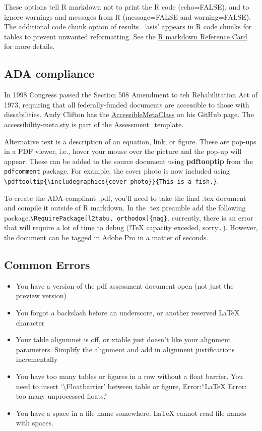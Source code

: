 \documentclass[12pt,]{article}
\begin{document}
These options tell R markdown not to print the R code (echo=FALSE), and
to ignore warnings and messages from R (message=FALSE and
warning=FALSE). The additional code chunk option of results=`asis'
appears in R code chunks for tables to prevent unwanted reformatting.
See the
\href{https://www.rstudio.com/wp-content/uploads/2015/03/rmarkdown-reference.pdf}{R
markdown Reference Card} for more details.

\subsection{ADA compliance}\label{ada-compliance}

In 1998 Congress passed the Section 508 Amendment to teh Rehabilitation
Act of 1973, requiring that all federally-funded documents are
accessible to those with dissabilities. Andy Clifton has the
\href{https://github.com/AndyClifton/AccessibleMetaClass}{AccessibleMetaClass}
on his GitHub page. The accessibility-meta.sty is part of the
Assessment\_template.

Alternative text is a description of an equation, link, or figure. These
are pop-ups in a PDF viewer, i.e., hover your mouse over the picture and
the pop-up will appear. These can be added to the source document using
\textbf{pdftooptip} from the \texttt{pdfcomment} package. For example,
the cover photo is now included using
\texttt{\textbackslash{}pdftooltip\{\textbackslash{}includegraphics\{cover\_photo\}\}\{This\ is\ a\ fish.\}}.

To create the ADA compliant .pdf, you'll need to take the final .tex
document and compile it outside of R markdown. In the .tex preamble add
the following
package.\texttt{\textbackslash{}RequirePackage{[}l2tabu,\ orthodox{]}\{nag\}}.
currently, there is an error that will require a lot of time to debug
(!TeX capacity exceded, sorry\ldots{}). However, the document can be
tagged in Adobe Pro in a matter of seconds.

\subsection{Common Errors}\label{common-errors}

\begin{itemize}
\item
  You have a version of the pdf assessment document open (not just the
  preview version)
\item
  You forgot a backslash before an underscore, or another reserved LaTeX
  character
\item
  Your table alignmnet is off, or xtable just doesn't like your
  alignment parameters. Simplify the alignment and add in alignment
  justifications incrementally
\item
  You have too many tables or figures in a row without a float barrier.
  You need to insert `\textbackslash{}Floatbarrier' between table or
  figure, Error:``LaTeX Error: too many unprocessed floats.''
\item
  You have a space in a file name somewhere. LaTeX cannot read file
  names with spaces.
\end{itemize}
\end{document}

